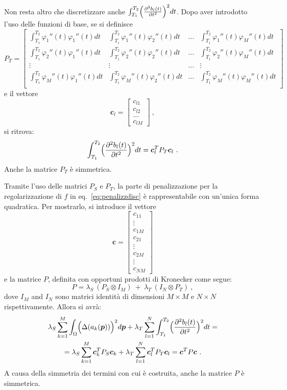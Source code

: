 \documentclass[a4paper,11pt,twoside,openright]{book}							%
\begin{document}
Non resta altro che discretizzare anche $\int_{T_1}^{T_2} \Bigl( \frac{\partial^2   b_l(t)   }{\partial t ^2} \Bigr)^2 dt$. Dopo aver introdotto l'uso delle funzioni di base, se si definisce 
 $$ P_T = \begin{bmatrix}
\int_{T_1}^{T_2} \varphi_1''(t) \varphi_1''(t) dt  & \int_{T_1}^{T_2} \varphi_1''(t) \varphi_2''(t) dt & \hdots & \int_{T_1}^{T_2} \varphi_1''(t) \varphi_M''(t) dt  \\
\int_{T_1}^{T_2} \varphi_2''(t) \varphi_1''(t) dt  & \int_{T_1}^{T_2} \varphi_2''(t) \varphi_2''(t) dt & \hdots & \int_{T_1}^{T_2} \varphi_2''(t) \varphi_M''(t) dt  \\
\vdots & \vdots & \hdots & \vdots \\
\int_{T_1}^{T_2} \varphi_M''(t) \varphi_1''(t) dt  & \int_{T_1}^{T_2} \varphi_M''(t) \varphi_2''(t) dt & \hdots & \int_{T_1}^{T_2} \varphi_M''(t) \varphi_M''(t) dt  \\
\end{bmatrix} $$
e il vettore $$
\bm{c}_l =
\begin{bmatrix}
c_{l1} \\ c_{l2} \\ \hdots \\ c_{lM}
\end{bmatrix} \ ,$$ si ritrova:
$$
\int_{T_1}^{T_2} \Bigl( \frac{\partial^2   b_l(t)   }{\partial t ^2} \Bigr)^2 dt = \bm{c}_l^T  P_T \bm{c}_l \ .
$$
Anche la matrice $P_T$ è simmetrica.

Tramite l'uso delle matrici $P_S$ e $P_T$, la parte di penalizzazione per la regolarizzazione di $f$ in eq.~\eqref{eq:penalizzdisc} è rappresentabile con un'unica forma quadratica. Per mostrarlo, si introduce il vettore
$$\bm c =
\begin{bmatrix}
c_{11}  \\
\vdots\\
c_{1M}  \\
c_{21}  \\
\vdots\\
c_{2M}  \\
\vdots\\
c_{NM}
\end{bmatrix}
$$
e la matrice $P$, definita con opportuni prodotti di Kronecker come segue:
$$
P = \lambda_S\    (P_S \otimes I_M)   \ +\  \lambda_T\   (I_N \otimes P_T) \ ,
$$
dove $I_M$ and $I_N$ sono matrici identità di dimensioni $M \times M$ e $N \times N$ rispettivamente. Allora si avrà:
\begin{multline}
\lambda_S  \sum_{k=1}^M \int_{\Omega} \Bigl( \Delta(  a_k(\bm p)  ) \Bigr)^2 d \bm p + \lambda_T \sum_{l=1}^N\int_{T_1}^{T_2} \Bigl( \frac{\partial^2   b_l(t)   }{\partial t ^2} \Bigr)^2 dt =
\\ = \lambda_S\sum_{k=1}^M\bm{c}_k^T P_S \bm{c}_k + \lambda_T\sum_{l=1}^N\bm{c}_l^T P_T \bm{c}_l = \bm{c}^T P \bm{c} \ .
\end{multline}
A causa della simmetria dei termini con cui è costruita, anche la matrice $P$ è simmetrica.
\end{document}
